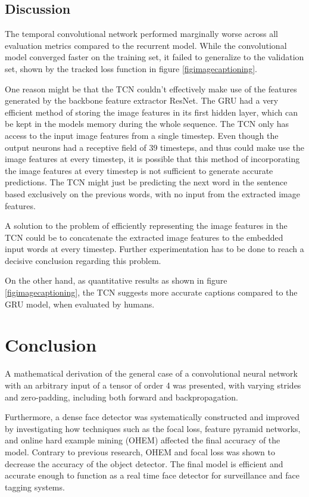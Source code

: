 \documentclass[a4paper, twoside]{article}
\begin{document}
\subsection{Discussion}
The temporal convolutional network performed marginally worse across all evaluation metrics compared to the recurrent model. While the convolutional model converged faster on the training set, it failed to generalize to the validation set, shown by the tracked loss function in figure \ref{figimagecaptioning}.

One reason might be that the TCN couldn't effectively make use of the features generated by the backbone feature extractor ResNet. The GRU had a very efficient method of storing the image features in its first hidden layer, which can be kept in the models memory during the whole sequence. The TCN only has access to the input image features from a single timestep. Even though the output neurons had a receptive field of 39 timesteps, and thus could make use the image features at every timestep, it is possible that this method of incorporating the image features at every timestep is not sufficient to generate accurate predictions. The TCN might just be predicting the next word in the sentence based exclusively on the previous words, with no input from the extracted image features.

A solution to the problem of efficiently representing the image features in the TCN could be to concatenate the extracted image features to the embedded input words at every timestep. Further experimentation has to be done to reach a decisive conclusion regarding this problem.

On the other hand, as quantitative results as shown in figure \ref{figimagecaptioning}, the TCN suggests more accurate captions compared to the GRU model, when evaluated by humans.

\section{Conclusion} 
A mathematical derivation of the general case of a convolutional neural network with an arbitrary input of a tensor of order 4 was presented, with varying strides and zero-padding, including both forward and backpropagation. 

Furthermore, a dense face detector was systematically constructed and improved by investigating how techniques such as the focal loss, feature pyramid networks, and online hard example mining (OHEM) affected the final accuracy of the model. Contrary to previous research, OHEM and focal loss was shown to decrease the accuracy of the object detector. The final model is efficient and accurate enough to function as a real time face detector for surveillance and face tagging systems.
\end{document}
